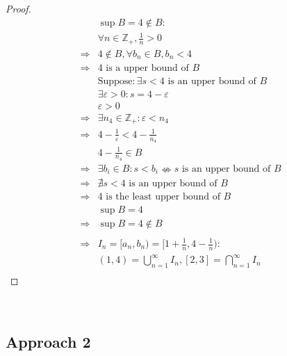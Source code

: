 \documentclass{article}
\begin{document}
\begin{proof}
\begin{align*}
        &\sup B=4\notin B:\\
        &\forall n\in\mathbb{Z} _+,\frac{1}{n}>0\\
        \Rightarrow&4\notin B,\forall b_n\in B, b_n<4\\
        \Rightarrow&4\text{ is a upper bound of }B\\
        &\text{Suppose}:\exists s<4 \text{ is an upper bound of }B\\
        &\exists \varepsilon>0: s=4-\varepsilon\\
        &\varepsilon>0\\
        \Rightarrow&\exists n_4\in\mathbb{Z} _+:\varepsilon<n_4\\
        \Rightarrow&4-\frac{1}{\varepsilon}<4-\frac{1}{n_4}\\
        &4-\frac{1}{n_4}\in B\\
        \Rightarrow&\exists b_i\in B:s<b_i\nLeftrightarrow s \text{ is an upper bound of }B\\
        \Rightarrow&\nexists s<4\text{ is an upper bound of }B\\
        \Rightarrow&4\text{ is the least upper bound of }B\\
        &\sup B=4\\
        \Rightarrow&\sup B=4\notin B\\
        &\\
        \Rightarrow&I_n=[a_n,b_n)=[1+\frac{1}{n},4-\frac{1}{n}):\\
        &(1,4)=\bigcup_{n=1}^{\infty}I_n,[2,3]=\bigcap_{n=1}^{\infty}I_n\\
    \end{align*}
\end{proof}

~

\subsection*{Approach 2}

~
\end{document}

